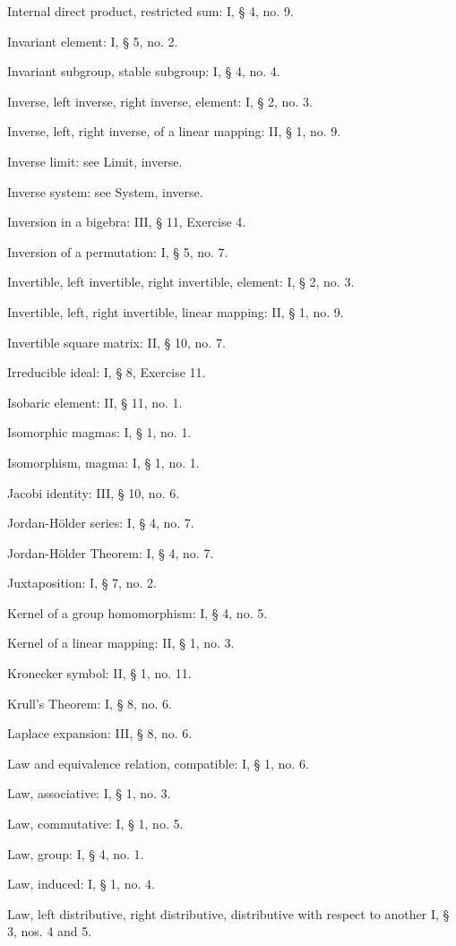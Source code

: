 Internal direct product, restricted sum: I, § 4, no. 9.

Invariant element: I, § 5, no. 2.

Invariant subgroup, stable subgroup: I, § 4, no. 4.

Inverse, left inverse, right inverse, element: I, § 2, no. 3.

Inverse, left, right inverse, of a linear mapping: II, § 1, no. 9.

Inverse limit: see Limit, inverse.

Inverse system: see System, inverse.

Inversion in a bigebra: III, § 11, Exercise 4.

Inversion of a permutation: I, § 5, no. 7.

Invertible, left invertible, right invertible, element: I, § 2, no. 3.

Invertible, left, right invertible, linear mapping: II, § 1, no. 9.

Invertible square matrix: II, § 10, no. 7.

Irreducible ideal: I, § 8, Exercise 11.

Isobaric element: II, § 11, no. 1.

Isomorphic magmas: I, § 1, no. 1.

Isomorphism, magma: I, § 1, no. 1.

Jacobi identity: III, § 10, no. 6.

Jordan-Hölder series: I, § 4, no. 7.

Jordan-Hölder Theorem: I, § 4, no. 7.

Juxtaposition: I, § 7, no. 2.

Kernel of a group homomorphism: I, § 4, no. 5.

Kernel of a linear mapping: II, § 1, no. 3.

Kronecker symbol: II, § 1, no. 11.

Krull's Theorem: I, § 8, no. 6.

Laplace expansion: III, § 8, no. 6.

Law and equivalence relation, compatible: I, § 1, no. 6.

Law, associative: I, § 1, no. 3.

Law, commutative: I, § 1, no. 5.

Law, group: I, § 4, no. 1.

Law, induced: I, § 1, no. 4.

Law, left distributive, right distributive, distributive with respect to another I, § 3, nos. 4 and 5.

